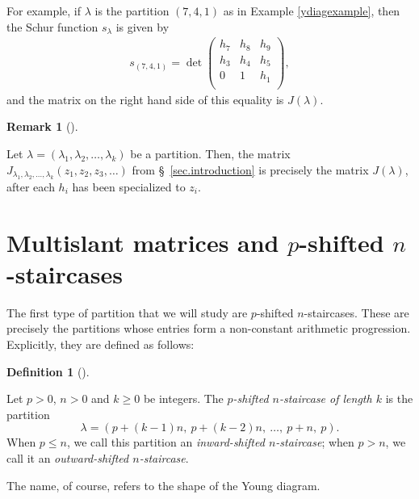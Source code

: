 \documentclass[numbers=enddot,12pt,final,onecolumn,notitlepage]{scrartcl}%
\theoremstyle{definition}
\newtheorem{defi}[theo]{Definition}
\newenvironment{definition}[1][]
{\begin{defi}[#1]\begin{leftbar}}
{\end{leftbar}\end{defi}}
\newtheorem{remk}[theo]{Remark}
\newenvironment{remark}[1][]
{\begin{remk}[#1]\begin{leftbar}}
{\end{leftbar}\end{remk}}
\newcommand{\NN}{\mathbb{N}}
\newcommand{\tup}[1]{\left( #1 \right)}
\renewcommand{\leq}{\leqslant}
\renewcommand{\geq}{\geqslant}
\theoremstyle{plainsl}
\begin{document}
For example, if $\lambda$ is the partition $(7,4,1)$ as in Example \ref{ydiagexample}, then the Schur function $s_\lambda$ is given by
\begin{align*}
s_{(7,4,1)} =
\det
\begin{pmatrix}
h_7 & h_8 & h_9 \\
h_3 & h_4 & h_5 \\
0 & 1 & h_1 \\
\end{pmatrix} ,
\end{align*}
and the matrix on the right hand side of this equality is $J\tup{\lambda}$.


\begin{remark}
Let
$\lambda = \tup{\lambda_1, \lambda_2, \ldots, \lambda_k}$
be a partition.
Then, the matrix
$J_{\lambda_1, \lambda_2, \ldots, \lambda_k}\tup{z_1, z_2, z_3, \ldots}$
from \S~\ref{sec.introduction} is precisely the matrix
$J\tup{\lambda}$, after each $h_i$ has been specialized to $z_i$.
\end{remark}

\section{\label{sec.mulslant}Multislant matrices and $p$-shifted $n$-staircases}

The first type of partition that we will study are $p$-shifted $n$-staircases.
These are precisely the partitions whose entries form a non-constant
arithmetic progression.
Explicitly, they are defined as follows:

\begin{definition}
Let $p > 0$, $n > 0$ and $k \geq 0$ be integers.
The \emph{$p$-shifted $n$-staircase of length $k$}
is the partition
\[
\lambda = (p+(k-1)n, \ p+(k-2)n, \ \ldots, \ p+n, \  p) .
\]
When $p \leq n$, we call this partition an \emph{inward-shifted $n$-staircase};
when $p > n$, we call it an \emph{outward-shifted $n$-staircase}.

\end{definition}

The name, of course, refers to the shape of the Young diagram.

\end{document}
